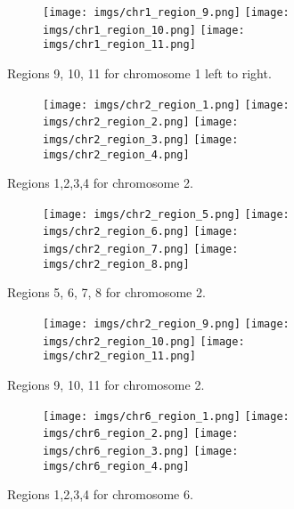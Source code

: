 \begin{figure}[h]
	\begin{subfigure}{}
		\texttt{[image: imgs/chr1\_region\_9.png]}
		\texttt{[image: imgs/chr1\_region\_10.png]}
		\texttt{[image: imgs/chr1\_region\_11.png]}	
	\end{subfigure}
	
	\caption{Regions 9, 10, 11  for chromosome 1 left to right.  }
	\label{fig:image3}
\end{figure}


\begin{figure}[h]
	\begin{subfigure}{}
		\texttt{[image: imgs/chr2\_region\_1.png]}
		\texttt{[image: imgs/chr2\_region\_2.png]}
		\texttt{[image: imgs/chr2\_region\_3.png]}
		\texttt{[image: imgs/chr2\_region\_4.png]}
	\end{subfigure}
	\caption{Regions 1,2,3,4  for chromosome 2.}
	\label{fig:image4}
\end{figure}

\begin{figure}[h]
	\begin{subfigure}{}
		\texttt{[image: imgs/chr2\_region\_5.png]}
		\texttt{[image: imgs/chr2\_region\_6.png]}
		\texttt{[image: imgs/chr2\_region\_7.png]}
		\texttt{[image: imgs/chr2\_region\_8.png]}
	\end{subfigure}
	\caption{Regions 5, 6, 7, 8  for chromosome 2.}
	\label{fig:image5}
\end{figure}

\begin{figure}[h]
	\begin{subfigure}{}
		\texttt{[image: imgs/chr2\_region\_9.png]}
		\texttt{[image: imgs/chr2\_region\_10.png]}
		\texttt{[image: imgs/chr2\_region\_11.png]}
	\end{subfigure}
	\caption{Regions 9, 10, 11  for chromosome 2.}
	\label{fig:image6}
\end{figure}

\begin{figure}[h]
	
	\begin{subfigure}{}
		\texttt{[image: imgs/chr6\_region\_1.png]}
		\texttt{[image: imgs/chr6\_region\_2.png]}
		\texttt{[image: imgs/chr6\_region\_3.png]}
		\texttt{[image: imgs/chr6\_region\_4.png]}
	\end{subfigure}
	
	\caption{Regions 1,2,3,4  for chromosome 6.  }
	\label{fig:image7}
\end{figure}


